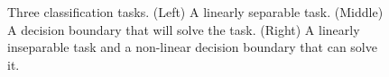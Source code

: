 \begin{figure}[h]
\centering
{}
\hspace*{.4in}
\hspace*{.4in}
\caption[Jeff Yoshimi.]{Three classification tasks. (Left) A linearly separable task. (Middle) A decision boundary that will solve the task. (Right) A linearly inseparable task and a non-linear decision boundary that can solve it.}
\label{F:decisionBoundaries}
\end{figure}

